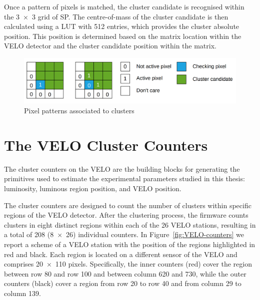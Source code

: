 Once a pattern of pixels is matched, the cluster candidate is recognised within the 3~×~3 grid of SP. The centre-of-mass of the cluster candidate is then calculated using a LUT with 512 entries, which provides the cluster absolute position. This position is determined based on the matrix location within the VELO detector and the cluster candidate position within the matrix.

\begin{figure}
    \centering
    \includegraphics[width=\textwidth]{figures/cluster_recognition.png}
    \caption{Pixel patterns associated to clusters}
    \label{fig:cluster_recognition}
\end{figure}

\section{The VELO Cluster Counters}\label{sec:velo_counters}
The cluster counters on the VELO are the building blocks for generating the primitives used to estimate the experimental parameters studied in this thesis: luminosity, luminous region position, and VELO position. 

The cluster counters are designed to count the number of clusters within specific regions of the VELO detector. After the clustering process, the firmware counts clusters in eight distinct regions within each of the 26 VELO stations, resulting in a total of 208 (8~×~26) individual counters. In Figure~\ref{fig:VELO-counters} we report a scheme of a VELO station with the position of the regions highlighted in red and black. Each region is located on a different sensor of the VELO and comprises 20~×~110 pixels. Specifically, the inner counters (red) cover the region between row 80 and row 100 and between column 620 and 730, while the outer counters (black) cover a region from row 20 to row 40 and from column 29 to column 139. 


